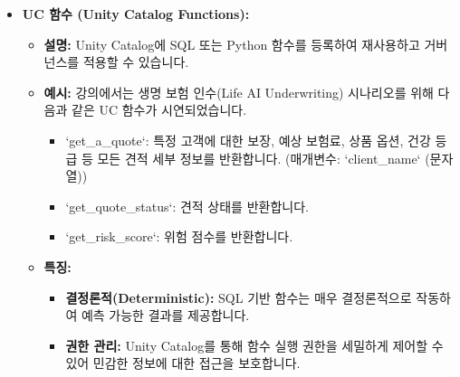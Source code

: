 \documentclass[11pt,a4paper]{article}
\begin{document}
\begin{itemize}
    \item \textbf{UC 함수 (Unity Catalog Functions):}
    \begin{itemize}
        \item \textbf{설명:} Unity Catalog에 SQL 또는 Python 함수를 등록하여 재사용하고 거버넌스를 적용할 수 있습니다.
        \item \textbf{예시:} 강의에서는 생명 보험 인수(Life AI Underwriting) 시나리오를 위해 다음과 같은 UC 함수가 시연되었습니다.
        \begin{itemize}
            \item `get_a_quote`: 특정 고객에 대한 보장, 예상 보험료, 상품 옵션, 건강 등급 등 모든 견적 세부 정보를 반환합니다. (매개변수: `client_name` (문자열))
            \item `get_quote_status`: 견적 상태를 반환합니다.
            \item `get_risk_score`: 위험 점수를 반환합니다.
        \end{itemize}
        \item \textbf{특징:}
        \begin{itemize}
            \item \textbf{결정론적(Deterministic):} SQL 기반 함수는 매우 결정론적으로 작동하여 예측 가능한 결과를 제공합니다.
            \item \textbf{권한 관리:} Unity Catalog를 통해 함수 실행 권한을 세밀하게 제어할 수 있어 민감한 정보에 대한 접근을 보호합니다.
        \end{itemize}
    \end{itemize}


\end{itemize}
\end{document}
